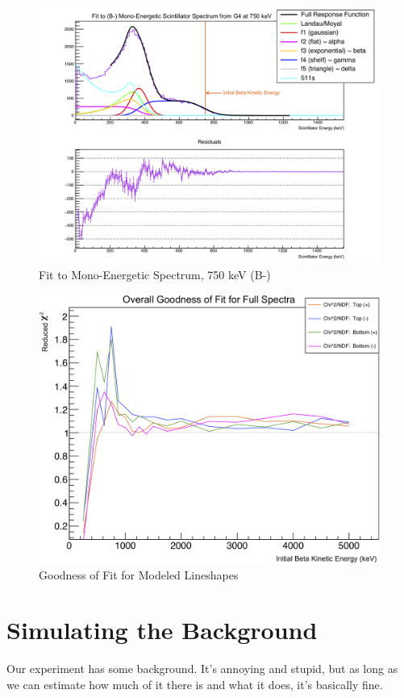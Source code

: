 \begin{figure}[h!!tb]
	\centering
	\includegraphics[width=.999\linewidth]
	{Figures/MonoFit_750.png}
	\caption[Fit to Mono-Energetic Spectrum, 750 keV]{Fit to Mono-Energetic Spectrum, 750 keV (B-)}	
\end{figure}


\begin{figure}[h!!tb]
	\centering
	\includegraphics[width=.999\linewidth]
	{Figures/Lineshape_Chi2.png}
	\caption[Goodness of Fit for Modeled Lineshapes]{Goodness of Fit for Modeled Lineshapes}	
\end{figure}

\section{Simulating the Background}
\label{sec:tof_bg}
Our experiment has some background.  It's annoying and stupid, but as long as we can estimate how much of it there is and what it does, it's basically fine.

